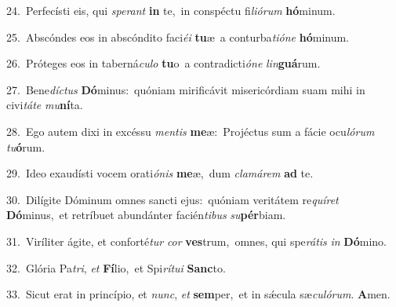 {\numbfont\textcolor{\numbcolor}{24.}}~Perfecísti eis, qui \textit{spe}\-\textit{rant} \textbf{in} te,~\star in conspéctu fi\-\textit{li}\-\textit{ó}\textit{rum} \textbf{hó}\-minum.\par
{\numbfont\textcolor{\numbcolor}{25.}}~Abscóndes eos in abscóndito faci\-\textit{é}\-\textit{i} \textbf{tu}\-æ~\star a conturba\-\textit{ti}\-\textit{ó}\textit{ne} \textbf{hó}\-minum.\par
{\numbfont\textcolor{\numbcolor}{26.}}~Próteges eos in taberná\-\textit{cu}\-\textit{lo} \textbf{tu}\-o~\star a contradicti\-\textit{ó}\-\textit{ne} \textit{lin}\-\textbf{guá}rum.\par
{\numbfont\textcolor{\numbcolor}{27.}}~Bene\-\textit{díc}\-\textit{tus} \textbf{Dó}\-minus:~\star quóniam mirificávit misericórdiam suam mihi in civi\-\textit{tá}\-\textit{te} \textit{mu}\-\textbf{ní}ta.\par
{\numbfont\textcolor{\numbcolor}{28.}}~Ego autem dixi in excéssu \textit{men}\-\textit{tis} \textbf{me}\-æ:~\star Projéctus sum a fácie ocu\-\textit{ló}\-\textit{rum} \textit{tu}\-\textbf{ó}rum.\par
{\numbfont\textcolor{\numbcolor}{29.}}~Ideo exaudísti vocem orati\-\textit{ó}\-\textit{nis} \textbf{me}\-æ,~\star dum \textit{cla}\-\textit{má}\textit{rem} \textbf{ad} te.\par
{\numbfont\textcolor{\numbcolor}{30.}}~Dilígite Dóminum omnes sancti ejus:~\dagger quóniam veritátem re\-\textit{quí}\-\textit{ret} \textbf{Dó}\-minus,~\star et retríbuet abundánter facién\-\textit{ti}\-\textit{bus} \textit{su}\-\textbf{pér}biam.\par
{\numbfont\textcolor{\numbcolor}{31.}}~Viríliter ágite, et conforté\textit{tur} \textit{cor} \textbf{ves}\-trum,~\star omnes, qui spe\-\textit{rá}\-\textit{tis} \textit{in} \textbf{Dó}\-mino.\par
{\numbfont\textcolor{\numbcolor}{32.}}~Glória Pa\-\textit{tri}\-, \textit{et} \textbf{Fí}\-lio,~\star et Spi\-\textit{rí}\-\textit{tu}\textit{i} \textbf{Sanc}\-to.\par
{\numbfont\textcolor{\numbcolor}{33.}}~Sicut erat in princípio, et \textit{nunc}\-, \textit{et} \textbf{sem}\-per,~\star et in sǽcula sæ\-\textit{cu}\-\textit{ló}\textit{rum}. \textbf{A}\-men.\par

